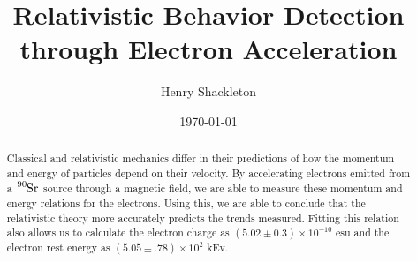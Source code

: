 \usepackage{graphicx}      %
\usepackage{lipsum}
\usepackage{float}
\usepackage{bm}            %
\usepackage{physics}
\usepackage{tensor}
\usepackage[colorlinks=true]{hyperref}  %




\title{Relativistic Behavior Detection through Electron Acceleration}
\author{Henry Shackleton}
\date{\today}


\begin{abstract}
  Classical and relativistic mechanics differ in their predictions of how the momentum and energy of particles depend on their velocity. By accelerating electrons emitted from a $\tensor*[^{90}]{\text{Sr}}{}$ source through a magnetic field, we are able to measure these momentum and energy relations for the electrons. Using this, we are able to conclude that the relativistic theory more accurately predicts the trends measured. Fitting this relation also allows us to calculate the electron charge as $(5.02 \pm 0.3) \times 10^{-10}$ esu and the electron rest energy as $(5.05 \pm .78) \times 10^{2}$ kEv.
\end{abstract}

\maketitle
